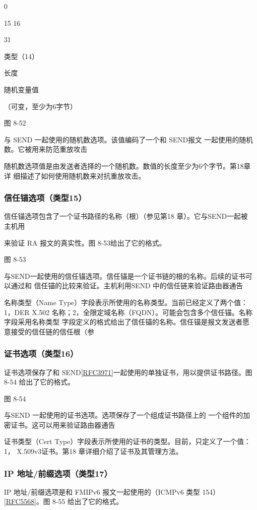0

15 16

31

类型（14）

长度

随机变量值

（可变，至少为6字节）

图 8-52

与 SEND 一起使用的随机数选项。该值编码了一个和 SEND报文
一起使用的随机数。它被用来防范重放攻击

随机数选项值是由发送者选择的一个随机数。数值的长度至少为6个字节。第18章详
细描述了如何使用随机数来对抗重放攻击。

\subsubsection{信任锚选项（类型15）}
信任锚选项包含了一个证书路径的名称（根）（参见第18 章）。它与SEND一起被主机用

来验证 RA 报文的真实性。图 8-53给出了它的格式。


图 8-53

与SEND一起使用的信任锚选项。信任锚是一个证书链的根的名称。后续的证书可以通过和
信任锚的比较来验证。主机利用SEND 中的信任链来验证路由器通告

名称类型（Name Type）字段表示所使用的名称类型。当前已经定义了两个值：1，DER
X.502 名称；2，全限定域名称（FQDN）。可能会包含多个信任锚。名称字段采用名称类型
字段定义的格式给出了信任锚的名称。信任锚是报文发送者愿意接受的信任链的信任根（参
\subsubsection{证书选项（类型16）}
证书选项保存了和 SEND\href{https://www.rfc-editor.org/rfc/rfc3971}{[RFC3971]}一起使用的单独证书，用以提供证书路径。图8-54
给出了它的格式。

图 8-54

与SEND 一起使用的证书选项。选项保存了一个组成证书路径上的
一个组件的加密证书。这可以用来验证路由器通告

证书类型（Cert Type）字段表示所使用的证书的类型。目前，只定义了一个值：1，
X.509v3证书。第18 章详细介绍了证书及其管理方法。

\subsubsection{IP 地址/前缀选项（类型17）}
IP 地址/前缀选项是和 FMIPv6 报文一起使用的（ICMPv6 类型 154）\href{https://www.rfc-editor.org/rfc/rfc5568}{[RFC5568]}。图
8-55 给出了它的格式。

